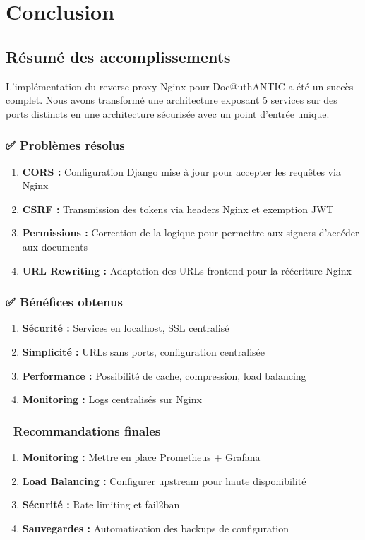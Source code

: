 \documentclass[12pt,a4paper]{article}
\begin{document}
\section{Conclusion}

\subsection{Résumé des accomplissements}

L'implémentation du reverse proxy Nginx pour Doc@uthANTIC a été un succès complet. Nous avons transformé une architecture exposant 5 services sur des ports distincts en une architecture sécurisée avec un point d'entrée unique.

\subsubsection{✅ Problèmes résolus}
\begin{enumerate}[leftmargin=*]
    \item \textbf{CORS :} Configuration Django mise à jour pour accepter les requêtes via Nginx
    \item \textbf{CSRF :} Transmission des tokens via headers Nginx et exemption JWT
    \item \textbf{Permissions :} Correction de la logique pour permettre aux signers d'accéder aux documents
    \item \textbf{URL Rewriting :} Adaptation des URLs frontend pour la réécriture Nginx
\end{enumerate}

\subsubsection{✅ Bénéfices obtenus}
\begin{enumerate}[leftmargin=*]
    \item \textbf{Sécurité :} Services en localhost, SSL centralisé
    \item \textbf{Simplicité :} URLs sans ports, configuration centralisée
    \item \textbf{Performance :} Possibilité de cache, compression, load balancing
    \item \textbf{Monitoring :} Logs centralisés sur Nginx
\end{enumerate}

\subsubsection{🎯 Recommandations finales}
\begin{enumerate}[leftmargin=*]
    \item \textbf{Monitoring :} Mettre en place Prometheus + Grafana
    \item \textbf{Load Balancing :} Configurer upstream pour haute disponibilité
    \item \textbf{Sécurité :} Rate limiting et fail2ban
    \item \textbf{Sauvegardes :} Automatisation des backups de configuration
\end{enumerate}
\end{document}
